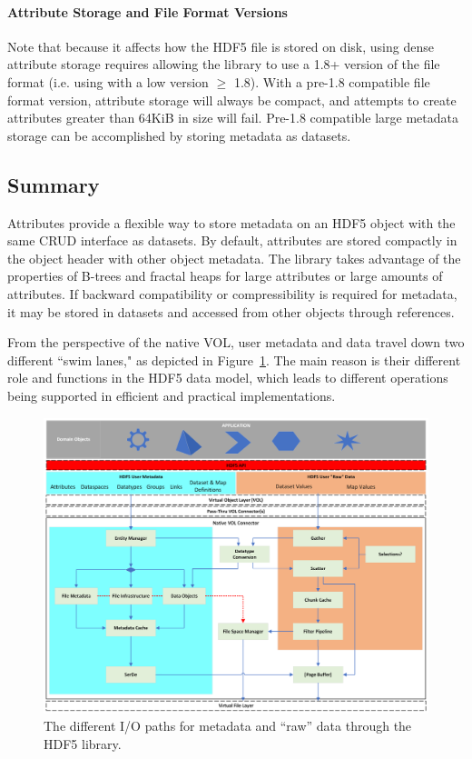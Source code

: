 \paragraph{Attribute Storage and File Format Versions}  Note that because it affects how the HDF5 file is stored on disk, using dense attribute storage requires allowing the library to use a 1.8+ version of the file format (i.e. using  with a low version $\geq$ 1.8). With a pre-1.8 compatible file format version, attribute storage will always be compact, and attempts to create attributes greater than 64KiB in size will fail. Pre-1.8 compatible large metadata storage can be accomplished by storing metadata as datasets.

\subsection{Summary}

Attributes provide a flexible way to store metadata on an HDF5 object with the same CRUD interface as datasets. By default, attributes are stored compactly in the object header with other object metadata. The library takes advantage of the properties of B-trees and fractal heaps for large attributes or large amounts of attributes. If backward compatibility or compressibility is required for metadata, it may be stored in datasets and accessed from other objects through references.

From the perspective of the native VOL, user metadata and data travel down two different ``swim lanes," as depicted in Figure~\ref{fig:io-paths}. The main reason is their different role and functions in the HDF5 data model, which leads to different operations being supported in efficient and practical implementations.

\begin{landscape}
\begin{figure}
\centering
\includegraphics[scale=0.74,angle=90]{images/HDF5 library meta data.png}
\caption{The different I/O paths for metadata and ``raw'' data through the HDF5 library.\label{fig:io-paths}}
\end{figure}
\end{landscape}
